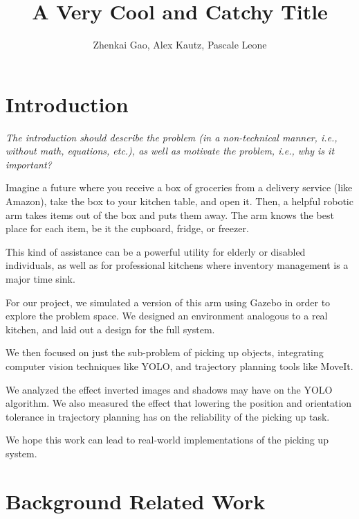 \documentclass{article}
\title{A Very Cool and Catchy Title}
\author{Zhenkai Gao, Alex Kautz, Pascale Leone
}
\date{\vspace{-1em}}
\begin{document}
\maketitle


\section{Introduction}

\textit{The introduction should describe the problem (in a non-technical manner, i.e., without math, equations, etc.), as well as motivate the problem, i.e., why is it important?}

Imagine a future where you receive a box of groceries from a delivery service (like Amazon), take the box to your kitchen table, and open it. Then, a helpful robotic arm takes items out of the box and puts them away. The arm knows the best place for each item, be it the cupboard, fridge, or freezer.

This kind of assistance can be a powerful utility for elderly or disabled individuals, as well as for professional kitchens where inventory management is a major time sink.

For our project, we simulated a version of this arm using Gazebo in order to explore the problem space. We designed an environment analogous to a real kitchen, and laid out a design for the full system.

We then focused on just the sub-problem of picking up objects, integrating computer vision techniques like YOLO, and trajectory planning tools like MoveIt.

We analyzed the effect inverted images and shadows may have on the YOLO algorithm. We also measured the effect that lowering the position and orientation tolerance in trajectory planning has on the reliability of the picking up task.

We hope this work can lead to real-world implementations of the picking up system.


\section{Background Related Work}
\end{document}
